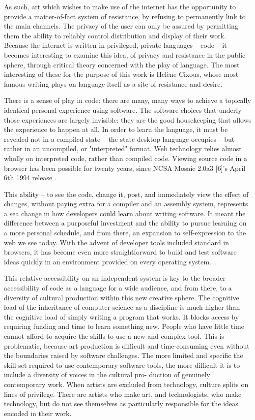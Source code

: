 As such, art which wishes to make use of the internet has the opportunity to provide a matter-of-fact system of resistance, by refusing to permanently link to the main channels. The privacy of the user can only be assured by permitting them the ability to reliably control distribution and display of their work. Because the internet is written in privileged, private languages – code – it becomes interesting to examine this idea, of privacy and resistance in the public sphere, through critical theory concerned with the play of language. The most interesting of these for the purpose of this work is Helène Cixous, whose most famous writing plays on language itself as a site of resistance and desire.

There is a sense of play in code: there are many, many ways to achieve a topically identical personal experience using software. The software choices that underly those experiences are largely invisible: they are the good housekeeping that allows the experience to happen at all. In order to learn the language, it must be revealed not in a compiled state – the state desktop language occupies – but rather in an uncompiled, or "interpreted" format. Web technology relies almost wholly on interpreted code, rather than compiled code. Viewing source code in a browser has been possible for twenty years, since NCSA Mosaic 2.0a3 [6]'s April 6th 1994 release \parencite{mosaic}.

This ability – to see the code, change it, post, and immediately view the effect of changes, without paying extra for a compiler and an assembly system, represents a sea change in how developers could learn about writing software. It meant the difference between a purposeful investment and the ability to pursue learning on a more personal schedule, and from there, an expansion to self-expression to the web we see today. With the advent of developer tools included standard in browsers, it has become even more straightforward to build and test software ideas quickly in an environment provided on every operating system. 

This relative accessibility on an independent system is key to the broader accessibility of code as a language for a wide audience, and from there, to a diversity of cultural production within this new creative sphere. The cognitive load of the inheritance of computer science as a discipline is much higher than the cognitive load of simply writing a program that works. It blocks access by requiring funding and time to learn something new. People who have little time cannot afford to acquire the skills to use a new and complex tool. This is problematic, because art production is difficult and time-consuming even without the boundaries raised by software challenges. The more limited and specific the skill set required to use contemporary software tools, the more difficult it is to include a diversity of voices in the cultural pro- duction of genuinely contemporary work. When artists are excluded from technology, culture splits on lines of privilege. There are artists who make art, and technologists, who make technology, but do not see themselves as particularly responsible for the ideas encoded in their work. 

